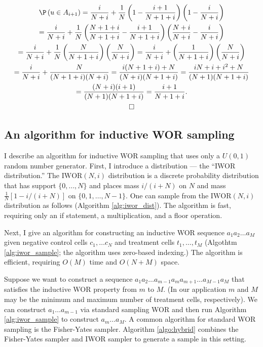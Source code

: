 \documentclass[12pt]{article}
\begin{document}
\begin{multline*}
\P \left( u \in A_{i+1} \right) = \frac{i}{N + i} + \frac{1}{N} \left(1 - \frac{i+1}{N+1+i}\right) \left( 1 - \frac{i}{N+i} \right) \\ = \frac{i}{N+i} + \frac{1}{N} \left( \frac{N+1+i}{N+1+i} - \frac{i+1}{N+1+i} \right)\left( \frac{N+i}{N+i} - \frac{i}{N+i} \right) \\ = \frac{i}{N+i} + \frac{1}{N} \left( \frac{N}{N+1+i} \right) \left( \frac{N}{N+i} \right) = \frac{i}{N+i} + \left( \frac{1}{N+1+i} \right)\left( \frac{N}{N+i} \right) \\ = \frac{i}{N+i} + \frac{N}{(N+1+i)(N+i)} = \frac{i(N+1+i) + N}{(N+i)(N+1+i)} = \frac{iN + i + i^2 + N}{(N+1)(N+1+i)} \\ = \frac{(N+i)(i+1)}{(N+1)(N+1+i)} = \frac{i+1}{N+1+i}. \\ \square
\end{multline*}


\subsection*{An algorithm for inductive WOR sampling}

I describe an algorithm for inductive WOR sampling that uses only a $U(0,1)$ random number generator. First, I introduce a distribution --- the ``IWOR distribution.'' The $\text{IWOR}(N, i)$ distribution is a discrete probability distribution that has support $\{ 0, \dots, N \}$ and places mass $i/(i + N)$ on $N$ and mass $\frac{1}{N}\left[1 - i/(i+N)\right]$ on $\{0, 1, \dots, N - 1\}.$ One can sample from the $\text{IWOR}(N,i)$ distribution as follows (Algorithm \ref{alg:iwor_dist}). The algorithm is fast, requiring only an if statement, a multiplication, and a floor operation.

Next, I give an algorithm for constructing an inductive WOR sequence $a_1 a_2 \dots a_M$ given negative control cells $c_1, \dots c_N$ and treatment cells $t_1, \dots, t_M$ (Algothtm \ref{alg:iwor_sample}; the algorithm uses zero-based indexing.) The algorithm is efficient, requiring $O(M)$ time and $O(N + M)$ space. %

Suppose we want to construct a sequence $a_1 a_2 \dots a_{m-1} a_m a_{m+1} \dots a_{M-1}a_M$ that satisfies the inductive WOR property from $m$ to $M$. (In our application $m$ and $M$ may be the minimum and maximum number of treatment cells, respectively). We can construct $a_1\dots a_{m-1}$ via standard sampling WOR and then run Algorithm \ref{alg:iwor_sample} to construct $a_m\dots a_M$. A common algorithm for standard WOR sampling is the Fisher-Yates sampler. Algorithm \ref{algo:hybrid} combines the Fisher-Yates sampler and IWOR sampler to generate a sample in this setting.
\end{document}
